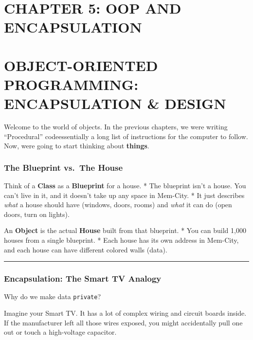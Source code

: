\hypertarget{chapter-5-oop-and-encapsulation}{%
\section{CHAPTER 5: OOP AND
ENCAPSULATION}\label{chapter-5-oop-and-encapsulation}}

\hypertarget{object-oriented-programming-encapsulation-design}{%
\section{OBJECT-ORIENTED PROGRAMMING: ENCAPSULATION \&
DESIGN}\label{object-oriented-programming-encapsulation-design}}

Welcome to the world of objects. In the previous chapters, we were
writing ``Procedural'' codeessentially a long list of instructions for
the computer to follow. Now, were going to start thinking about
\textbf{things}.

\hypertarget{the-blueprint-vs.-the-house}{%
\subsubsection{The Blueprint vs.~The
House}\label{the-blueprint-vs.-the-house}}

Think of a \textbf{Class} as a \textbf{Blueprint} for a house. * The
blueprint isn't a house. You can't live in it, and it doesn't take up
any space in Mem-City. * It just describes \emph{what} a house should
have (windows, doors, rooms) and \emph{what} it can do (open doors, turn
on lights).

An \textbf{Object} is the actual \textbf{House} built from that
blueprint. * You can build 1,000 houses from a single blueprint. * Each
house has its own address in Mem-City, and each house can have different
colored walls (data).

\begin{center}\rule{0.5\linewidth}{0.5pt}\end{center}

\hypertarget{encapsulation-the-smart-tv-analogy}{%
\subsubsection{Encapsulation: The Smart TV
Analogy}\label{encapsulation-the-smart-tv-analogy}}

Why do we make data \passthrough{\lstinline!private!}?

Imagine your Smart TV. It has a lot of complex wiring and circuit boards
inside. If the manufacturer left all those wires exposed, you might
accidentally pull one out or touch a high-voltage capacitor.

